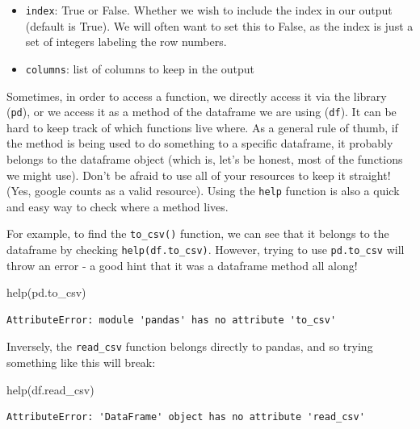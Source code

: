 \documentclass[
  letterpaper,
  DIV=11,
  numbers=noendperiod]{scrreprt}
\newenvironment{Shaded}{\begin{snugshade}}{\end{snugshade}}
\newcommand{\BuiltInTok}[1]{\textcolor[rgb]{0.00,0.23,0.31}{#1}}
\newcommand{\NormalTok}[1]{\textcolor[rgb]{0.00,0.23,0.31}{#1}}
\providecommand{\tightlist}{%
  \setlength{\itemsep}{0pt}\setlength{\parskip}{0pt}}\usepackage{longtable,booktabs,array}
\begin{document}
\begin{itemize}
\tightlist
\item
  \texttt{index}: True or False. Whether we wish to include the index in
  our output (default is True). We will often want to set this to False,
  as the index is just a set of integers labeling the row numbers.
\item
  \texttt{columns}: list of columns to keep in the output
\end{itemize}

\begin{tcolorbox}[enhanced jigsaw, rightrule=.15mm, opacitybacktitle=0.6, colback=white, toprule=.15mm, colframe=quarto-callout-tip-color-frame, bottomtitle=1mm, bottomrule=.15mm, arc=.35mm, coltitle=black, breakable, title=\textcolor{quarto-callout-tip-color}{\faLightbulb}\hspace{0.5em}{pd.method() or df.method()?}, titlerule=0mm, opacityback=0, colbacktitle=quarto-callout-tip-color!10!white, left=2mm, toptitle=1mm, leftrule=.75mm]

Sometimes, in order to access a function, we directly access it via the
library (\texttt{pd}), or we access it as a method of the dataframe we
are using (\texttt{df}). It can be hard to keep track of which functions
live where. As a general rule of thumb, if the method is being used to
do something to a specific dataframe, it probably belongs to the
dataframe object (which is, let's be honest, most of the functions we
might use). Don't be afraid to use all of your resources to keep it
straight! (Yes, google counts as a valid resource). Using the
\texttt{help} function is also a quick and easy way to check where a
method lives.

For example, to find the \texttt{to\_csv()} function, we can see that it
belongs to the dataframe by checking \texttt{help(df.to\_csv)}. However,
trying to use \texttt{pd.to\_csv} will throw an error - a good hint that
it was a dataframe method all along!

\begin{Shaded}
\begin{Highlighting}[]
\BuiltInTok{help}\NormalTok{(pd.to\_csv)}
\end{Highlighting}
\end{Shaded}

\begin{verbatim}
AttributeError: module 'pandas' has no attribute 'to_csv'
\end{verbatim}

Inversely, the \texttt{read\_csv} function belongs directly to pandas,
and so trying something like this will break:

\begin{Shaded}
\begin{Highlighting}[]
\BuiltInTok{help}\NormalTok{(df.read\_csv)}
\end{Highlighting}
\end{Shaded}

\begin{verbatim}
AttributeError: 'DataFrame' object has no attribute 'read_csv'
\end{verbatim}

\end{tcolorbox}
\end{document}
